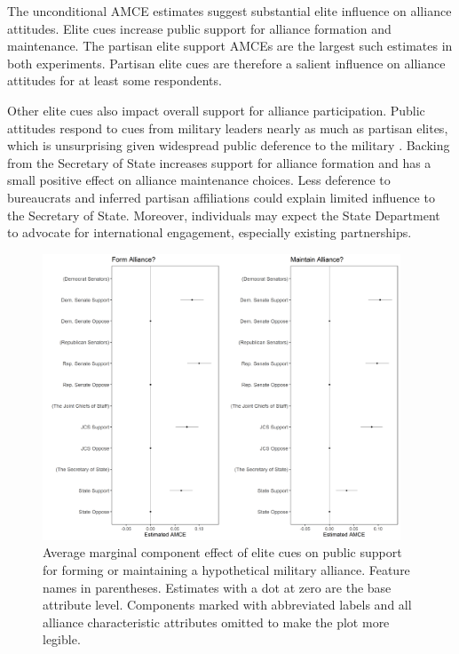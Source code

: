 \documentclass[12pt]{article}
\begin{document}
The unconditional AMCE estimates suggest substantial elite influence on alliance attitudes. 
Elite cues increase public support for alliance formation and maintenance. 
The partisan elite support AMCEs are the largest such estimates in both experiments.
Partisan elite cues are therefore a salient influence on alliance attitudes for at least some respondents. 


Other elite cues also impact overall support for alliance participation. 
Public attitudes respond to cues from military leaders nearly as much as partisan elites, which is unsurprising given widespread public deference to the military \citep{Golbyetal2018}. 
Backing from the Secretary of State increases support for alliance formation and has a small positive effect on alliance maintenance choices. 
Less deference to bureaucrats and inferred partisan affiliations could explain limited influence to the Secretary of State. 
Moreover, individuals may expect the State Department to advocate for international engagement, especially existing partnerships.


\begin{figure}[htpb]
	\centering
		\includegraphics[width=0.95\textwidth]{../figures/joint-amce-plots-el.png}
	\caption{Average marginal component effect of elite cues on public support for forming or maintaining a hypothetical military alliance. Feature names in parentheses. Estimates with a dot at zero are the base attribute level. Components marked with abbreviated labels and all alliance characteristic attributes omitted to make the plot more legible.}
	\label{fig:joint-plot}
\end{figure}
\end{document}
